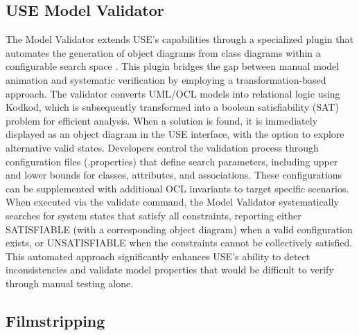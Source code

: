 \subsection{USE Model Validator}
The Model Validator extends USE's capabilities through a specialized plugin that 
automates the generation of object diagrams from class diagrams within a configurable 
search space \cite{USE}. This plugin bridges the gap between manual model animation 
and systematic verification by employing a transformation-based approach. The 
validator converts UML/OCL models into relational logic using Kodkod, which is 
subsequently transformed into a boolean satisfiability (SAT) problem for efficient 
analysis. When a solution is found, it is immediately displayed as an object diagram 
in the USE interface, with the option to explore alternative valid states. Developers 
control the validation process through configuration files (.properties) that define 
search parameters, including upper and lower bounds for classes, attributes, and 
associations. These configurations can be supplemented with additional OCL invariants 
to target specific scenarios. When executed via the validate command, the Model 
Validator systematically searches for system states that satisfy all constraints, 
reporting either SATISFIABLE (with a corresponding object diagram) when a valid 
configuration exists, or UNSATISFIABLE when the constraints cannot be collectively 
satisfied. This automated approach significantly enhances USE's ability to detect 
inconsistencies and validate model properties that would be difficult to verify 
through manual testing alone.


\subsection{Filmstripping}

